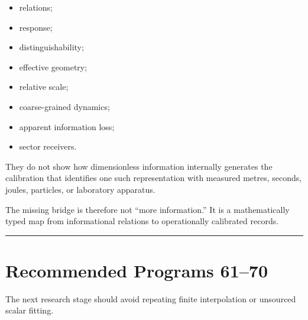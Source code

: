 \documentclass[11pt,a4paper,openany]{report}
\begin{document}
\begin{itemize}
\item 
relations;

\item 
response;

\item 
distinguishability;

\item 
effective geometry;

\item 
relative scale;

\item 
coarse-grained dynamics;

\item 
apparent information loss;

\item 
sector receivers.

\end{itemize}

They do not show how dimensionless information internally generates the calibration that identifies one such representation with measured metres, seconds, joules, particles, or laboratory apparatus.

The missing bridge is therefore not “more information.” It is a mathematically typed map from informational relations to operationally calibrated records.

\par\medskip\hrule\medskip

\chapter{Recommended Programs 61–70}

The next research stage should avoid repeating finite interpolation or unsourced scalar fitting.
\end{document}
